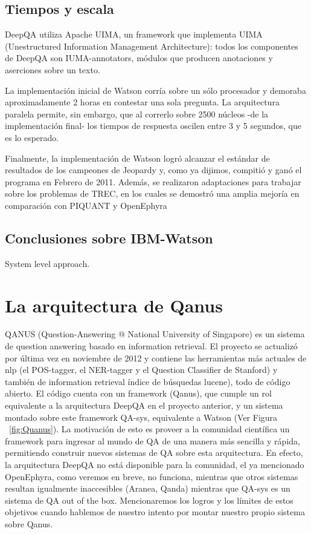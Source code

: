 \bigskip

\subsection{Tiempos y escala}

DeepQA utiliza Apache UIMA, un framework que implementa UIMA
(Unestructured Information Management Architecture): todos los
componentes de DeepQA son IUMA-annotators, m\'odulos que producen
anotaciones y aserciones sobre un texto.

La implementaci\'on inicial de Watson corr\'ia sobre un s\'olo
procesador y demoraba aproximadamente 2 horas en contestar una sola
pregunta. La arquitectura paralela permite, sin embargo, que al
correrlo sobre 2500 n\'ucleos -de la implementaci\'on final- los
tiempos de respuesta oscilen entre 3 y 5 segundos, que es lo esperado.

Finalmente, la implementaci\'on de Watson logr\'o alcanzar el est\'andar
de resultados de los campeones de Jeopardy y, como ya dijimos,
compiti\'o y gan\'o el programa en Febrero de 2011. Adem\'as, se
realizaron adaptaciones para trabajar sobre los problemas de TREC, en
los cuales se demostr\'o una amplia mejor\'ia en comparaci\'on con
PIQUANT y OpenEphyra


\bigskip

\subsection{Conclusiones sobre IBM-Watson}

System level approach.


\bigskip

\section{La arquitectura de Qanus}

QANUS (Question-Answering @ National University of Singapore) es un
sistema de question answering basado en information retrieval. El
proyecto se actualiz\'o por \'ultima vez en noviembre de 2012 y
contiene las herramientas m\'as actuales de nlp (el POS-tagger, el
NER-tagger y el Question Classifier de Stanford) y tambi\'en de
information retrieval \'indice de b\'usquedas lucene), todo de c\'odigo
abierto. El c\'odigo cuenta con un framework (Qanus), que cumple un rol
equivalente a la arquitectura DeepQA en el proyecto anterior, y un
sistema montado sobre este framework QA-sys, equivalente a Watson (Ver Figura ~\ref{fig:Quanus}). La
motivaci\'on de esto es proveer a la comunidad cient\'ifica un
framework para ingresar al mundo de QA de una manera m\'as sencilla y
r\'apida, permitiendo construir nuevos sistemas de QA sobre esta
arquitectura. En efecto, la arquitectura DeepQA no est\'a disponible
para la comunidad, el ya mencionado OpenEphyra, como veremos en breve,
no funciona, mientras que otros sistemas resultan igualmente
inaccesibles (Aranea, Qanda) mientras que QA-sys es un sistema de QA
out of the box. Mencionaremos los logros y los l\'imites de estos
objetivos cuando hablemos de nuestro intento por montar nuestro propio
sistema sobre Qanus. 

